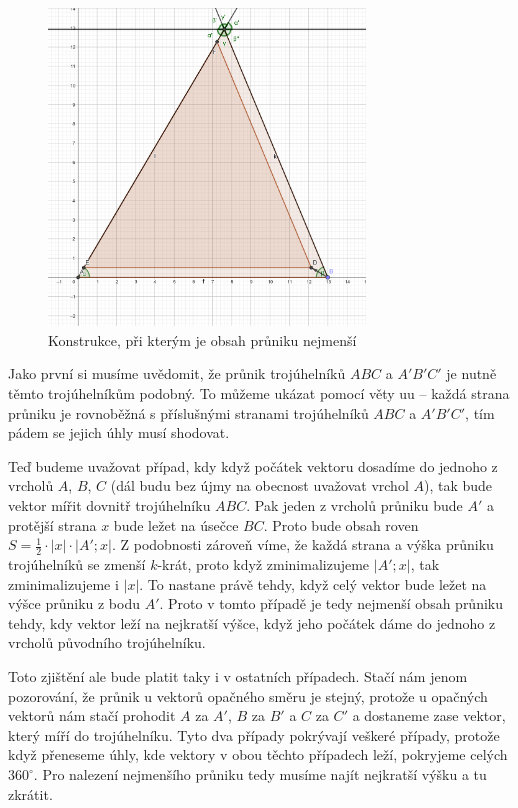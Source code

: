 \documentclass{fkssolpub}
\author{Ondřej Sedláček}
\begin{document}
\begin{figure}
	\begin{center}
		\includegraphics[width=0.75\textwidth]{4-fig}
	\end{center}
	\caption{Konstrukce, při kterým je obsah průniku nejmenší}
	\label{fig:1}
\end{figure}


Jako první si musíme uvědomit, že průnik trojúhelníků $ABC$ a $A'B'C'$ je nutně těmto trojúhelníkům podobný. To můžeme ukázat pomocí věty uu -- každá strana průniku je rovnoběžná s příslušnými stranami trojúhelníků $ABC$ a $A'B'C'$, tím pádem se jejich úhly musí shodovat.

Teď budeme uvažovat případ, kdy když počátek vektoru dosadíme do jednoho z vrcholů $A$, $B$, $C$ (dál budu bez újmy na obecnost uvažovat vrchol $A$), tak bude vektor mířit dovnitř trojúhelníku $ABC$. Pak jeden z vrcholů průniku bude $A'$ a protější strana $x$ bude ležet na úsečce $BC$. Proto bude obsah roven $S = \frac{1}{2} \cdot |x| \cdot |A'; x|$. Z podobnosti zároveň víme, že každá strana a výška průniku trojúhelníků se zmenší $k$-krát, proto když zminimalizujeme $|A'; x|$, tak zminimalizujeme i $|x|$. To nastane právě tehdy, když celý vektor bude ležet na výšce průniku z bodu $A'$. Proto v tomto případě je tedy nejmenší obsah průniku tehdy, kdy vektor leží na nejkratší výšce, když jeho počátek dáme do jednoho z vrcholů původního trojúhelníku.

Toto zjištění ale bude platit taky i v ostatních případech. Stačí nám jenom pozorování, že průnik u vektorů opačného směru je stejný, protože u opačných vektorů nám stačí prohodit $A$ za $A'$, $B$ za $B'$ a $C$ za $C'$ a dostaneme zase vektor, který míří do trojúhelníku. Tyto dva případy pokrývají veškeré případy, protože když přeneseme úhly, kde vektory v obou těchto případech leží, pokryjeme celých $360 ^{\circ}$. Pro nalezení nejmenšího průniku tedy musíme najít nejkratší výšku a tu zkrátit.
\end{document}
